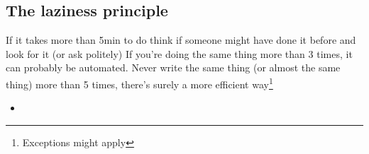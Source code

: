 \subsection{The laziness principle}
\label{sub:lazy}
If it takes more than 5min to do think if someone might have done it before and look for it (or ask politely)
If you're doing the same thing more than 3 times, it can probably be automated. Never write the same thing (or almost the same thing) more than 5 times, there's surely a more efficient way\footnote{Exceptions might apply}

\begin{itemize}
    \item
\end{itemize}
